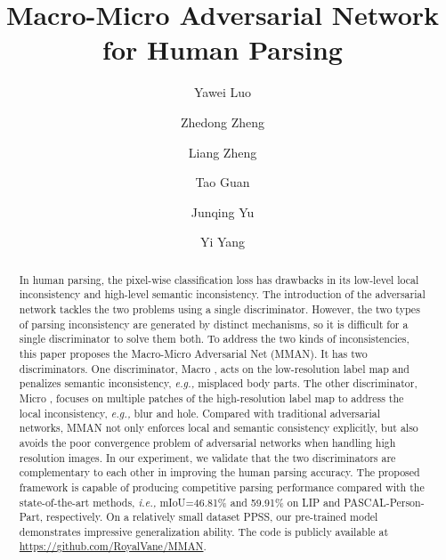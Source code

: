 \documentclass[runningheads]{llncs}
\begin{document}
\pagestyle{headings}
\mainmatter
\def\ECCV18SubNumber{597}  

\title{Macro-Micro Adversarial Network \\ for Human Parsing} 


\author{Yawei Luo \and
Zhedong Zheng \and
Liang Zheng \and
Tao Guan \and
Junqing Yu \and
Yi Yang}


\maketitle
\begin{abstract}
In human parsing, the pixel-wise classification loss has drawbacks in its low-level local inconsistency and high-level semantic inconsistency. The introduction of the adversarial network tackles the two problems using a single discriminator. However, the two types of parsing inconsistency are generated by distinct mechanisms, so it is difficult for a single discriminator to solve them both. To address the two kinds of inconsistencies, this paper proposes the Macro-Micro Adversarial Net (MMAN). It has two discriminators. One discriminator, Macro , acts on the low-resolution label map and penalizes semantic inconsistency, \emph{e.g.,} misplaced body parts. The other discriminator, Micro , focuses on multiple patches of the high-resolution label map to address the local inconsistency, \emph{e.g.,} blur and hole. Compared with traditional adversarial networks, MMAN not only enforces local and semantic consistency explicitly, but also avoids the poor convergence problem of adversarial networks when handling high resolution images.
In our experiment, we validate that the two discriminators are complementary to each other in improving the human parsing accuracy. The proposed framework is capable of producing competitive parsing performance compared with the state-of-the-art methods, \emph{i.e.,} mIoU=46.81\% and 59.91\% on LIP and PASCAL-Person-Part, respectively. On a relatively small dataset PPSS, our pre-trained model demonstrates impressive generalization ability. The code is publicly available at \url{https://github.com/RoyalVane/MMAN}.

\end{abstract}
\end{document}
